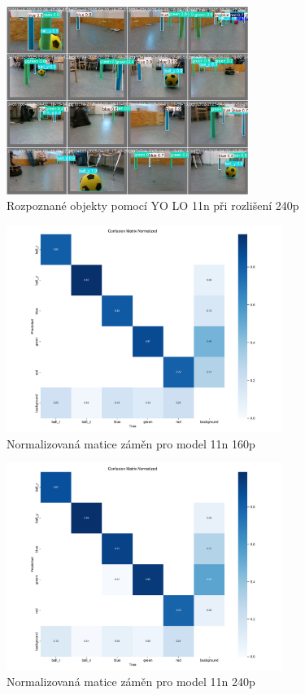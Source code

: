 \documentclass[a4paper,12pt]{article}
\begin{document}
\begin{figure}[H]
    \centering
    \includegraphics[width=0.7\textwidth]{pictures/rozpoznane.jpg}
    \caption{Rozpoznané objekty pomocí YO
    LO 11n při rozlišení 240p}
    \label{fig:detected_image}
\end{figure}

\begin{figure}[H]
    \centering
    \includegraphics[width=0.8\textwidth]{pictures/v11n_160p.png}
    \caption{Normalizovaná matice záměn pro model 11n 160p}
    \label{fig:confusion_matrix_160p}
\end{figure}

\begin{figure}[H]
    \centering
    \includegraphics[width=0.8\textwidth]{pictures/v11n_240p.png}
    \caption{Normalizovaná matice záměn pro model 11n 240p}
    \label{fig:confusion_matrix_240p}
\end{figure}
\end{document}
